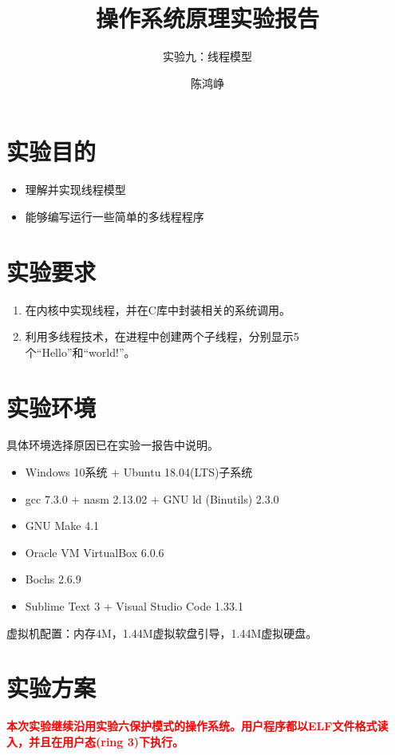 \documentclass[logo,reportComp]{thesis}
\title{操作系统原理实验报告}
\subtitle{实验九：线程模型}
\author{陈鸿峥}
\begin{document}
\maketitle

\section{实验目的}
\begin{itemize}
	\item 理解并实现线程模型
	\item 能够编写运行一些简单的多线程程序
\end{itemize}

\section{实验要求}
\begin{enumerate}
\item 在内核中实现线程，并在C库中封装相关的系统调用。
\item 利用多线程技术，在进程中创建两个子线程，分别显示5个“Hello”和“world!”。
\end{enumerate}

\section{实验环境}
具体环境选择原因已在实验一报告中说明。
\begin{itemize}
	\item Windows 10系统 + Ubuntu 18.04(LTS)子系统
	\item gcc 7.3.0 + nasm 2.13.02 + GNU ld (Binutils) 2.3.0
	\item GNU Make 4.1
	\item Oracle VM VirtualBox 6.0.6
	\item Bochs 2.6.9
	\item Sublime Text 3 + Visual Studio Code 1.33.1
\end{itemize}

虚拟机配置：内存4M，1.44M虚拟软盘引导，1.44M虚拟硬盘。

\section{实验方案}
{\textbf{\textcolor{red}{本次实验继续沿用实验六保护模式的操作系统。用户程序都以ELF文件格式读入，并且在用户态(ring 3)下执行。}}}
\end{document}
